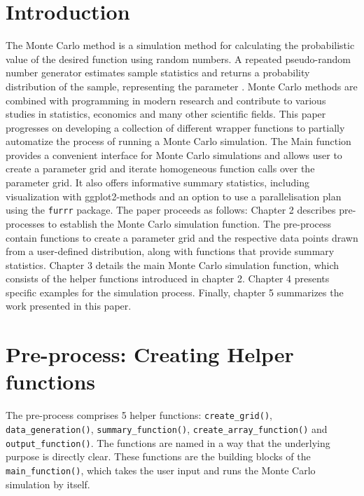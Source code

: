 \documentclass[11pt,a4paper]{article}
\begin{document}
\restoregeometry


{
\hypersetup{linkcolor=black}
\setcounter{tocdepth}{3}
\tableofcontents
}
\newpage
\listoftables
\newpage
\listoffigures
\newpage
{} 
\hypertarget{introduction}{%
\section{Introduction}\label{introduction}}

The Monte Carlo method is a simulation method for calculating the
probabilistic value of the desired function using random numbers. A
repeated pseudo-random number generator estimates sample statistics and
returns a probability distribution of the sample, representing the
parameter \autocite{Barbu_2020}. Monte Carlo methods are combined with
programming in modern research and contribute to various studies in
statistics, economics and many other scientific fields. This paper
progresses on developing a collection of different wrapper functions to
partially automatize the process of running a Monte Carlo simulation.
The Main function provides a convenient interface for Monte Carlo
simulations and allows user to create a parameter grid and iterate
homogeneous function calls over the parameter grid. It also offers
informative summary statistics, including visualization with
ggplot2-methods and an option to use a parallelisation plan using the
\texttt{furrr} package. The paper proceeds as follows: Chapter 2
describes pre-processes to establish the Monte Carlo simulation
function. The pre-process contain functions to create a parameter grid
and the respective data points drawn from a user-defined distribution,
along with functions that provide summary statistics. Chapter 3 details
the main Monte Carlo simulation function, which consists of the helper
functions introduced in chapter 2. Chapter 4 presents specific examples
for the simulation process. Finally, chapter 5 summarizes the work
presented in this paper.

\hypertarget{pre-process-creating-helper-functions}{%
\section{Pre-process: Creating Helper
functions}\label{pre-process-creating-helper-functions}}

The pre-process comprises 5 helper functions: \texttt{create\_grid()},
\texttt{data\_generation()}, \texttt{summary\_function()},
\texttt{create\_array\_function()} and \texttt{output\_function()}. The
functions are named in a way that the underlying purpose is directly
clear. These functions are the building blocks of the
\texttt{main\_function()}, which takes the user input and runs the Monte
Carlo simulation by itself.
\end{document}
